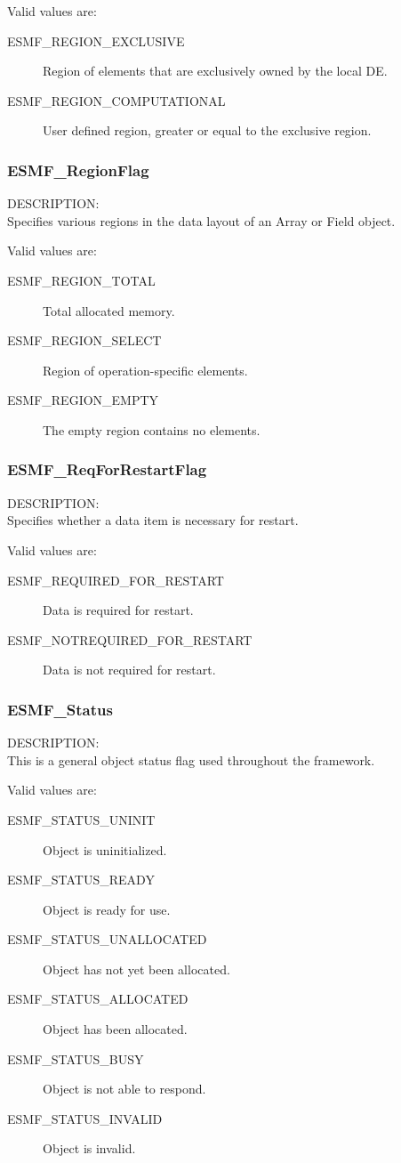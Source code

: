 Valid values are:
\begin{description}
\item [ESMF\_REGION\_EXCLUSIVE]
      Region of elements that are exclusively owned by the local DE.
\item [ESMF\_REGION\_COMPUTATIONAL]
      User defined region, greater or equal to the exclusive region.
\end{description}

\subsubsection{ESMF\_RegionFlag}
\label{opt:regionflag}
{\sf DESCRIPTION:\\}
Specifies various regions in the data layout of an Array or Field object.

Valid values are:
\begin{description}
\item [ESMF\_REGION\_TOTAL]
      Total allocated memory.
\item [ESMF\_REGION\_SELECT]
      Region of operation-specific elements.
\item [ESMF\_REGION\_EMPTY]
      The empty region contains no elements.
\end{description}

\subsubsection{ESMF\_ReqForRestartFlag}
\label{opt:reqforrestartflag}
{\sf DESCRIPTION:\\}
Specifies whether a data item is necessary for restart.

Valid values are:
\begin{description}
   \item [ESMF\_REQUIRED\_FOR\_RESTART] 
         Data is required for restart.
   \item [ESMF\_NOTREQUIRED\_FOR\_RESTART]
         Data is not required for restart.
\end{description}

\subsubsection{ESMF\_Status}
\label{opt:status}
{\sf DESCRIPTION:\\}
This is a general object status flag used throughout the
framework.

Valid values are:
\begin{description}
   \item [ESMF\_STATUS\_UNINIT] 
         Object is uninitialized.
   \item [ESMF\_STATUS\_READY]
         Object is ready for use.
   \item [ESMF\_STATUS\_UNALLOCATED]
         Object has not yet been allocated.
   \item [ESMF\_STATUS\_ALLOCATED]
         Object has been allocated.
   \item [ESMF\_STATUS\_BUSY]
         Object is not able to respond.
   \item [ESMF\_STATUS\_INVALID]
         Object is invalid.
\end{description}


